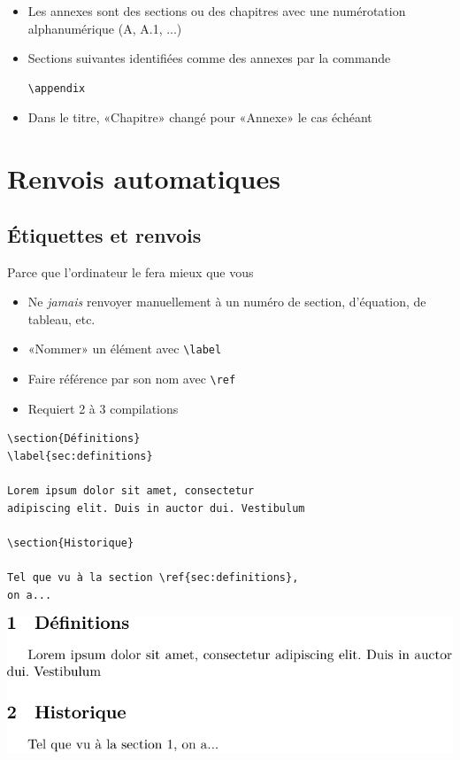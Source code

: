 \begin{itemize}
\item Les annexes sont des sections ou des chapitres avec une
  numérotation alphanumérique (A, A.1, ...)
\item Sections suivantes identifiées comme des annexes par la commande
\begin{lstlisting}
\appendix
\end{lstlisting}
\item Dans le titre, «Chapitre» changé pour «Annexe» le cas échéant
\end{itemize}


\section{Renvois automatiques}
\label{sec:construction:renvois}


\subsection{Étiquettes et renvois}

Parce que l'ordinateur le fera mieux que vous

\begin{itemize}
\item Ne \emph{jamais} renvoyer manuellement à un numéro de section,
  d'équation, de tableau, etc.
\item «Nommer» un élément avec \verb=\label=
\item Faire référence par son nom avec \verb=\ref=
\item Requiert 2 à 3 compilations
\end{itemize}

\begin{demo}
\begin{lstlisting}[emph={\label,\ref}]
\section{Définitions}
\label{sec:definitions}

Lorem ipsum dolor sit amet, consectetur
adipiscing elit. Duis in auctor dui. Vestibulum

\section{Historique}

Tel que vu à la section \ref{sec:definitions},
on a...
\end{lstlisting}
  \begin{framed}
    \includegraphics[width=\linewidth]{renvoi}
  \end{framed}
\end{demo}

